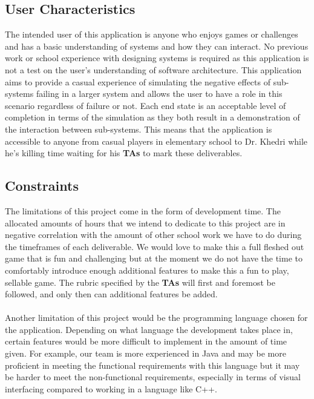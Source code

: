 \documentclass[12pt, titlepage]{article}
\newcommand\tab[1][1cm]{\hspace*{#1}}
\begin{document}
\subsection{User Characteristics}
\tab The intended user of this application is anyone who enjoys games or challenges and has a basic understanding of systems and how they can interact. No previous work or school experience with designing systems is required as this application is not a test on the user's understanding of software architecture. This application aims to provide a casual experience of simulating the negative effects of sub-systems failing in a larger system and allows the user to have a role in this scenario regardless of failure or not. Each end state is an acceptable level of completion in terms of the simulation as they both result in a demonstration of the interaction between sub-systems. This means that the application is accessible to anyone from casual players in elementary school to Dr. Khedri while he's killing time waiting for his  \textbf{TAs} to mark these deliverables.

\subsection{Constraints}
\tab The limitations of this project come in the form of development time. The allocated amounts of hours that we intend to dedicate to this project are in negative correlation with the amount of other school work we have to do during the timeframes of each deliverable. We would love to make this a full fleshed out game that is fun and challenging but at the moment we do not have the time to comfortably introduce enough additional features to make this a fun to play, sellable game. The rubric specified by the  \textbf{TAs} will first and foremost be followed, and only then can additional features be added. \\
\\ \tab Another limitation of this project would be the programming language chosen for the application. Depending on what language the development takes place in, certain features would be more difficult to implement in the amount of time given. For example, our team is more experienced in Java and may be more proficient in meeting the functional requirements with this language but it may be harder to meet the non-functional requirements, especially in terms of visual interfacing compared to working in a language like C++.
\end{document}
